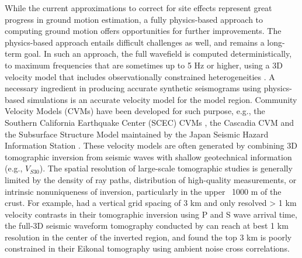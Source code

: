While the current approximations to correct for site effects represent great progress in ground motion estimation, a fully physics-based approach to computing ground motion offers opportunities for further improvements. The physics-based approach entails difficult challenges as well, and remains a long-term goal. In such an approach, the full wavefield is computed deterministically, to maximum frequencies that are sometimes up to 5 Hz or higher, using a 3D velocity model that includes observationally constrained heterogeneities \citep{savranGroundMotionSimulation2019,withersGroundMotionIntraevent2019,hu05HzDeterministic2021}. A necessary ingredient in producing accurate synthetic seismograms using physics-based simulations is an accurate velocity model for the model region. Community Velocity Models (CVMs) have been developed for such purpose, e.g., the Southern California Earthquake Center (SCEC) CVMs \citep{smallSCECUnifiedCommunity2017}, the Cascadia CVM \citep{stephensonCascadiaSubductionZone2017} and the Subsurface Structure Model maintained by the Japan Seismic Hazard Information Station \citep{fujiwaraJSHISINTEGRATEDSYSTEM2017}. These velocity models are often generated by combining 3D tomographic inversion from seismic waves \citep{tapeAdjointTomographySouthern2009,tapeSeismicTomographySouthern2010,leeFull3DTomographyCrustal2014} with shallow geotechnical information (e.g., $V_{S30}$). The spatial resolution of large-scale tomographic studies is generally limited by the density of ray paths, distribution of high-quality measurements, or intrinsic nonuniqueness of inversion, particularly in the upper ~1000 m of the crust. For example, \citet{linThreedimensionalCrustalSeismic2007} had a vertical grid spacing of 3 km and only resolved > 1 km velocity contrasts in their tomographic inversion using P and S wave arrival time, the full-3D seismic waveform tomography conducted by \citet{leeFull3DTomographyCrustal2014} can reach at best 1 km resolution in the center of the inverted region, and \citet{qiuEikonalTomographySouthern2019} found the top 3 km is poorly constrained in their Eikonal tomography using ambient noise cross correlations.

